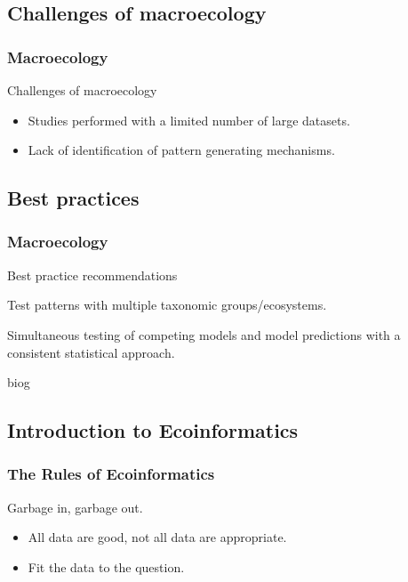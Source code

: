 \documentclass[14pt]{beamer}
\begin{document}
\subsection{Challenges of macroecology}
\begin{frame}[t]
\frametitle{Macroecology}
Challenges of macroecology\\
\begin{itemize}
\item Studies performed with a limited number of large datasets.
\item Lack of identification of pattern generating mechanisms.
\end{itemize}
\end{frame}



\subsection{Best practices}
\begin{frame}[t]
\frametitle{Macroecology}
Best practice recommendations\\
\begin{itemize}
\begin{small}
\item Test patterns with multiple taxonomic groups/ecosystems.  
\item Simultaneous testing of competing models and model predictions with a consistent statistical approach.
\end{small}
\end{itemize}
\end{frame}
biog\subsection{Introduction to Ecoinformatics}
\begin{frame}[t]
\frametitle{The Rules of Ecoinformatics}
\begin{Large}
Garbage in, garbage out.\\
\end{Large}
\begin{itemize}
\item All data are good, not all data are appropriate.
\item Fit the data to the question.
\end{itemize}
\end{frame}
\end{document}
